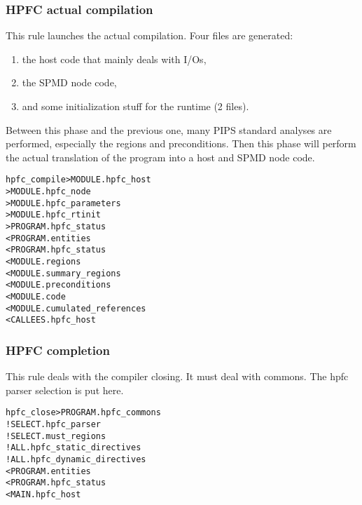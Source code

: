 \documentclass[a4paper]{report}
\newenvironment{PipsMake}{\begin{alltt}}{\end{alltt}}
\newenvironment{PipsPass}[1]{\label{pass:#1}}{}
\begin{document}
\subsubsection{HPFC actual compilation}

This rule launches the actual compilation. Four files are generated:

\begin{enumerate}
\item  the host code that mainly deals with I/Os,
\item the SPMD node code,
\item and some initialization stuff for the runtime (2 files).
\end{enumerate}

Between this phase and the previous
one, many PIPS standard analyses are performed, especially the regions and
preconditions.  Then this phase will perform the actual translation of the
program into a host and SPMD node code.

\begin{PipsMake}
hpfc_compile           > MODULE.hpfc_host
                       > MODULE.hpfc_node
                       > MODULE.hpfc_parameters
                       > MODULE.hpfc_rtinit
                       > PROGRAM.hpfc_status
    < PROGRAM.entities
    < PROGRAM.hpfc_status
    < MODULE.regions
    < MODULE.summary_regions
    < MODULE.preconditions
    < MODULE.code
    < MODULE.cumulated_references
    < CALLEES.hpfc_host
\end{PipsMake}

\subsubsection{HPFC completion}

\begin{PipsPass}{hpfc_close}
This rule deals with the compiler closing. It must deal with commons.
The hpfc parser selection is put here.
\end{PipsPass}

\begin{PipsMake}
hpfc_close             > PROGRAM.hpfc_commons
    ! SELECT.hpfc_parser
    ! SELECT.must_regions
    ! ALL.hpfc_static_directives
    ! ALL.hpfc_dynamic_directives
    < PROGRAM.entities
    < PROGRAM.hpfc_status
    < MAIN.hpfc_host
\end{PipsMake}
\end{document}
